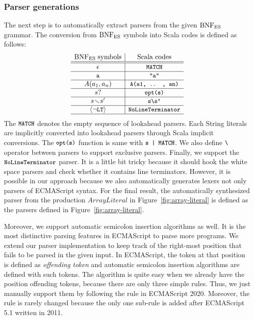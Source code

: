 \subsubsection{Parser generations}\label{sec:convert-bnfes}
The next step is to automatically extract parsers from the given \( \text{BNF}_{\text{ES}} \) grammar.
The conversion from \( \text{BNF}_{\text{ES}} \) symbols into Scala codes is defined as follows:
\[
  \begin{array}{c|c}
    \text{BNF}_{\text{ES}} \; \text{symbols} & \text{Scala codes}\\\hline\hline
    \epsilon & \texttt{\small MATCH}\\\hline
    \texttt{\small a} & \texttt{\small"a"}\\\hline
    A(a_1, a_n) & \texttt{\small A(a1, .. , an)}\\\hline
    s? & \texttt{\small opt(s)}\\\hline
    s \!\smallsetminus\! s' & \texttt{\small s\textbackslash s'}\\\hline
    \left<\neg\texttt{\small LT}\right> & \texttt{\small NoLineTerminator}\\\hline
  \end{array}
\]
The \( \texttt{\small MATCH} \) denotes the empty sequence of lookahead parsers.
Each String literals are implicitly converted into lookahead parsers
through Scala implicit conversions. The \( \texttt{\small opt(s)} \) function
is same with \( \texttt{\small s | MATCH} \). We also define \( \texttt{\small\textbackslash} \)
operator between parsers to support exclusive parsers.
Finally, we support the \( \texttt{\small NoLineTerminator} \) parser.
It is a little bit tricky because it should hook the white space parsers
and check whether it contains line terminators.
However, it is possible in our approach because
we also automatically generates lexers not only parsers of ECMAScript syntax.
For the final result, the automatically synthesized parser from the
production \( ArrayLiteral \) in Figure~\ref{fig:array-literal} is defined
as the parsers defined in Figure~\ref{fig:array-literal}.

Moreover, we support automatic semicolon insertion algorithms as well.
It is the most distinctive parsing features in ECMAScript to parse more programs.
We extend our parser implementation to keep track of the right-most position
that fails to be parsed in the given input. In ECMAScript, the token at that
position is defined as \textit{offending token} and automatic semicolon insertion
algorithms are defined with such tokens. The algorithm is quite easy when we
already have the position offending tokens, because there are only three simple
rules. Thus, we just manually support them by following the rule in ECMAScript 2020.
Moreover, the rule is rarely changed because the only one sub-rule is added
after ECMAScript 5.1 written in 2011.
